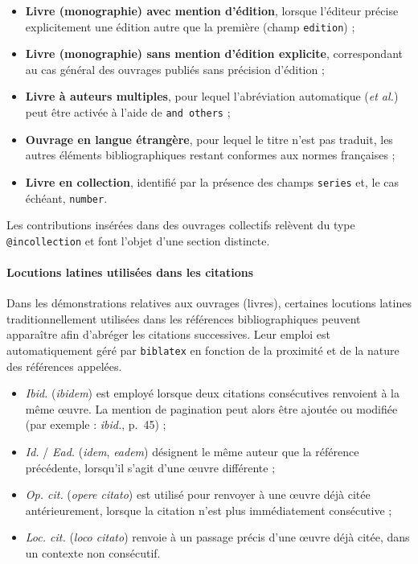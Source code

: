 \documentclass{article}
\begin{document}
\begin{itemize}
	\item \textbf{Livre (monographie) avec mention d'édition}, lorsque l'éditeur
	      précise explicitement une édition autre que la première
	      (champ \texttt{edition}) ;
	\item \textbf{Livre (monographie) sans mention d'édition explicite}, correspondant
	      au cas général des ouvrages publiés sans précision d'édition ;
	\item \textbf{Livre à auteurs multiples}, pour lequel l'abréviation automatique
	      (\emph{et al.}) peut être activée à l'aide de \texttt{and others} ;
	\item \textbf{Ouvrage en langue étrangère}, pour lequel le titre n'est pas traduit,
	      les autres éléments bibliographiques restant conformes aux normes françaises ;
	\item \textbf{Livre en collection}, identifié par la présence des champs
	      \texttt{series} et, le cas échéant, \texttt{number}.
\end{itemize}

Les contributions insérées dans des ouvrages collectifs relèvent du type
\texttt{@incollection} et font l'objet d'une section distincte.

\paragraph{Locutions latines utilisées dans les citations}

Dans les démonstrations relatives aux ouvrages (livres), certaines locutions
latines traditionnellement utilisées dans les références bibliographiques
peuvent apparaître afin d'abréger les citations successives. Leur emploi est
automatiquement géré par \texttt{biblatex} en fonction de la proximité et de la
nature des références appelées.

\begin{itemize}
	\item \emph{Ibid.} (\emph{ibidem}) est employé lorsque deux citations consécutives
	      renvoient à la même œuvre. La mention de pagination peut alors être ajoutée
	      ou modifiée (par exemple : \emph{ibid.}, p.~45) ;
	\item \emph{Id.} / \emph{Ead.} (\emph{idem}, \emph{eadem}) désignent le même auteur
	      que la référence précédente, lorsqu'il s'agit d'une œuvre différente ;
	\item \emph{Op. cit.} (\emph{opere citato}) est utilisé pour renvoyer à une œuvre
	      déjà citée antérieurement, lorsque la citation n'est plus immédiatement
	      consécutive ;
	\item \emph{Loc. cit.} (\emph{loco citato}) renvoie à un passage précis d'une œuvre
	      déjà citée, dans un contexte non consécutif.
\end{itemize}
\end{document}
